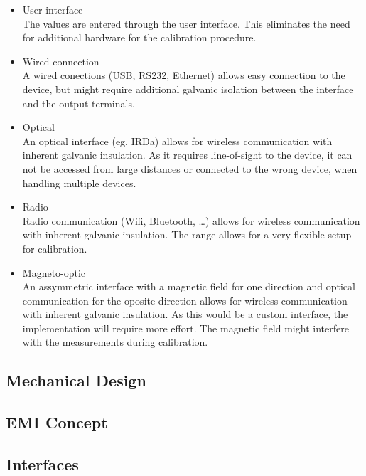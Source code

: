 \begin{itemize}
    \item User interface
        \\
        The values are entered through the user interface. This eliminates the need for additional hardware for the calibration procedure. 
    \item Wired connection
        \\
        A wired conections (\ac{USB}, RS232, Ethernet) allows easy connection to the device, but might require additional galvanic isolation between the interface and the output terminals. 
    \item Optical
        \\
        An optical interface (eg. IRDa) allows for wireless communication with inherent galvanic insulation. As it requires line-of-sight to the device, it can not be accessed from large distances or connected to the wrong device, when handling multiple devices. 
    \item Radio
        \\
        Radio communication (Wifi, Bluetooth, \ldots) allows for wireless communication with inherent galvanic insulation. The range allows for a very flexible setup for calibration. 
    \item Magneto-optic
        \\
        An assymmetric interface with a magnetic field for one direction and optical communication for the oposite direction allows for wireless communication with inherent galvanic insulation. As this would be a custom interface, the implementation will require more effort. The magnetic field might interfere with the measurements during calibration. 
\end{itemize}

\subsection{Mechanical Design}

\FloatBarrier
\subsection{EMI Concept}

\FloatBarrier
\subsection{Interfaces}

\FloatBarrier
